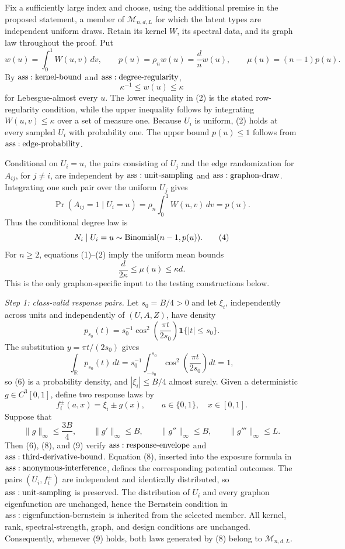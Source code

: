 Fix a sufficiently large index and choose, using the additional premise in the proposed statement, a member of \(\mathcal M_{n,d,L}\) for which the latent types are independent uniform draws.  Retain its kernel \(W\), its spectral data, and its graph law throughout the proof.  Put
\[
 w(u)=\int_0^1W(u,v)\,dv,
 \qquad
 p(u)=\rho_n w(u)=\frac dn w(u),
 \qquad
 \mu(u)=(n-1)p(u).
\tag{1}
\]
By \({\rm ass:kernel\text{-}bound}\) and \({\rm ass:degree\text{-}regularity}\),
\[
 \kappa^{-1}\leq w(u)\leq\kappa
\tag{2}
\]
for Lebesgue-almost every \(u\).  The lower inequality in (2) is the stated row-regularity condition, while the upper inequality follows by integrating \(W(u,v)\leq\kappa\) over a set of measure one.  Because \(U_i\) is uniform, (2) holds at every sampled \(U_i\) with probability one.  The upper bound \(p(u)\leq1\) follows from \({\rm ass:edge\text{-}probability}\).

Conditional on \(U_i=u\), the pairs consisting of \(U_j\) and the edge randomization for \(A_{ij}\), for \(j\ne i\), are independent by \({\rm ass:unit\text{-}sampling}\) and \({\rm ass:graphon\text{-}draw}\).  Integrating one such pair over the uniform \(U_j\) gives
\[
 \Pr(A_{ij}=1\mid U_i=u)
 =\rho_n\int_0^1W(u,v)\,dv=p(u).
\tag{3}
\]
Thus the conditional degree law is
\[
 N_i\mid U_i=u\sim{\rm Binomial}(n-1,p(u)).
\tag{4}
\]
For \(n\geq2\), equations (1)--(2) imply the uniform mean bounds
\[
 \frac{d}{2\kappa}\leq\mu(u)\leq\kappa d.
\tag{5}
\]
This is the only graphon-specific input to the testing constructions below.

\textit{Step 1: class-valid response pairs.}
Let \(s_0=B/4>0\) and let \(\xi_i\), independently across units and independently of \((U,A,Z)\), have density
\[
 p_{s_0}(t)=s_0^{-1}\cos^2\!\left(\frac{\pi t}{2s_0}\right)
 \mathbf 1\{|t|\leq s_0\}.
\tag{6}
\]
The substitution \(y=\pi t/(2s_0)\) gives
\[
 \int_{\mathbb R}p_{s_0}(t)\,dt
 =s_0^{-1}\int_{-s_0}^{s_0}
 \cos^2\!\left(\frac{\pi t}{2s_0}\right)dt=1,
\tag{7}
\]
so (6) is a probability density, and \(|\xi_i|\leq B/4\) almost surely.  Given a deterministic \(g\in C^3[0,1]\), define two response laws by
\[
 f_i^\pm(a,x)=\xi_i\pm g(x),
 \qquad a\in\{0,1\},\quad x\in[0,1].
\tag{8}
\]
Suppose that
\[
 \|g\|_\infty\leq\frac{3B}{4},
 \qquad
 \|g'\|_\infty\leq B,
 \qquad
 \|g''\|_\infty\leq B,
 \qquad
 \|g'''\|_\infty\leq L.
\tag{9}
\]
Then (6), (8), and (9) verify \({\rm ass:response\text{-}envelope}\) and \({\rm ass:third\text{-}derivative\text{-}bound}\).  Equation (8), inserted into the exposure formula in \({\rm ass:anonymous\text{-}interference}\), defines the corresponding potential outcomes.  The pairs \((U_i,f_i^\pm)\) are independent and identically distributed, so \({\rm ass:unit\text{-}sampling}\) is preserved.  The distribution of \(U_i\) and every graphon eigenfunction are unchanged, hence the Bernstein condition in \({\rm ass:eigenfunction\text{-}bernstein}\) is inherited from the selected member.  All kernel, rank, spectral-strength, graph, and design conditions are unchanged.  Consequently, whenever (9) holds, both laws generated by (8) belong to \(\mathcal M_{n,d,L}\).

